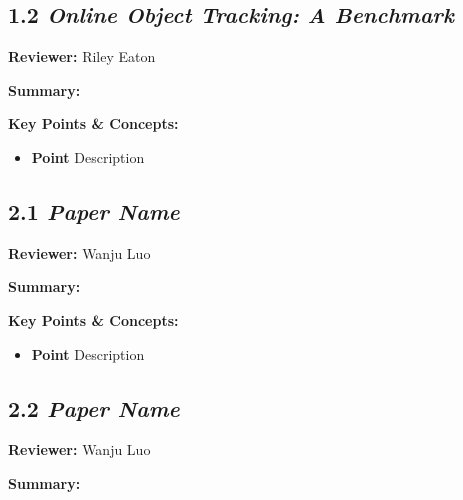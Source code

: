 \documentclass{article}
\begin{document}
\vspace{0.3cm}

\subsection*{1.2 \textit{Online Object Tracking: A Benchmark}}

\hspace*{\parindent}\textbf{Reviewer:} Riley Eaton

\vspace{0.3cm}

\textbf{Summary:}

\vspace{0.3cm}

\textbf{Key Points \& Concepts:}
\begin{itemize}
  \item \textbf{Point} Description
\end{itemize}

\subsection*{2.1 \textit{Paper Name}}

\hspace*{\parindent}\textbf{Reviewer:} Wanju Luo

\vspace{0.3cm}

\textbf{Summary:}

\vspace{0.3cm}

\textbf{Key Points \& Concepts:}
\begin{itemize}
  \item \textbf{Point} Description
\end{itemize}

\subsection*{2.2 \textit{Paper Name}}

\hspace*{\parindent}\textbf{Reviewer:} Wanju Luo

\vspace{0.3cm}

\textbf{Summary:}
\end{document}
